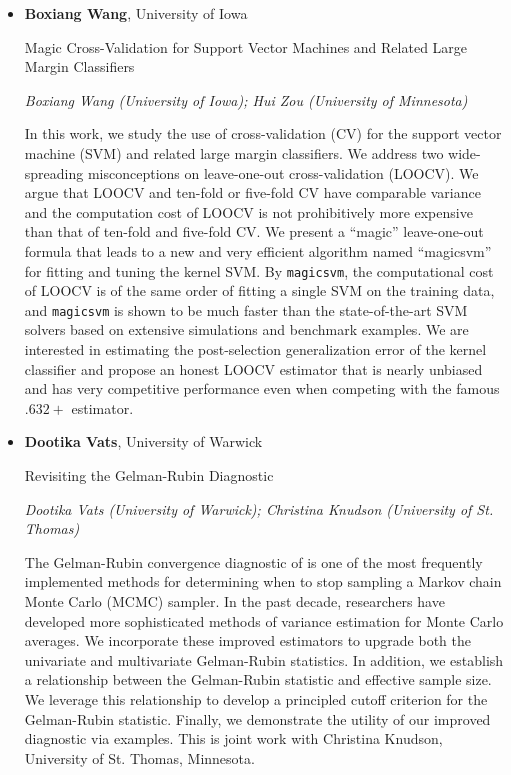 \begin{itemize}
\item \textbf{Boxiang Wang}, University of Iowa

Magic Cross-Validation for Support Vector Machines and Related Large Margin Classifiers

\emph{\footnotesize Boxiang Wang (University of Iowa); Hui Zou (University of Minnesota)}

In this work, we study the use of cross-validation (CV) for the support vector machine (SVM) and related large margin classifiers. We address two wide-spreading misconceptions on leave-one-out cross-validation (LOOCV). We argue that LOOCV and ten-fold or five-fold CV have comparable variance and the computation cost of LOOCV is not prohibitively more expensive than that of ten-fold and five-fold CV. We present a ``magic'' leave-one-out formula that leads to a new and very efficient algorithm named ``magicsvm'' for fitting and tuning the kernel SVM. By \texttt{magicsvm}, the computational cost of LOOCV is of the same order of fitting a single SVM on the training data, and  \texttt{magicsvm} is shown to be much faster than the state-of-the-art SVM solvers based on extensive simulations and benchmark examples. We are interested in estimating the post-selection generalization error of the kernel classifier and propose an honest LOOCV estimator that is nearly unbiased and has very competitive performance even when competing with the famous $.632+$ estimator.

\item \textbf{Dootika Vats}, University of Warwick

Revisiting the Gelman-Rubin Diagnostic

\emph{\footnotesize Dootika Vats (University of Warwick); Christina Knudson (University of St. Thomas)}

The Gelman-Rubin convergence diagnostic of  is one of the most frequently implemented methods for determining when to stop sampling a Markov chain Monte Carlo (MCMC) sampler. In the past decade, researchers have developed more sophisticated methods of variance estimation for Monte Carlo averages. We incorporate these improved estimators to upgrade both the univariate and multivariate Gelman-Rubin statistics. In addition, we establish a relationship between the Gelman-Rubin statistic and effective sample size. We leverage this relationship to develop a principled cutoff criterion for the Gelman-Rubin statistic. Finally, we demonstrate the utility of our improved diagnostic via examples. This is joint work with Christina Knudson, University of St. Thomas, Minnesota.

\end{itemize}

